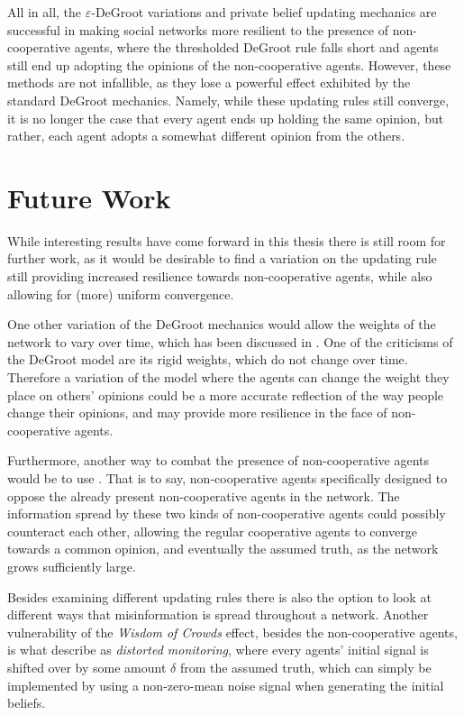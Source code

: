 \documentclass[a4paper, 12pt]{report}
\begin{document}
\noindent All in all, the $\varepsilon$-DeGroot variations and private belief updating mechanics are successful in making social networks more resilient to the presence of non-cooperative agents, where the thresholded DeGroot rule falls short and agents still end up adopting the opinions of the non-cooperative agents. However, these methods are not infallible, as they lose a powerful effect exhibited by the standard DeGroot mechanics. Namely, while these updating rules still converge, it is no longer the case that every agent ends up holding the same opinion, but rather, each agent adopts a somewhat different opinion from the others.

\chapter{Future Work}

While interesting results have come forward in this thesis there is still room for further work, as it would be desirable to find a variation on the updating rule still providing increased resilience towards non-cooperative agents, while also allowing for (more) uniform convergence.

\noindent One other variation of the DeGroot mechanics would allow the weights of the network to vary over time, which has been discussed in \parencite{chatterjee1977stochastic}. One of the criticisms of the DeGroot model are its rigid weights, which do not change over time. Therefore a variation of the model where the agents can change the weight they place on others' opinions could be a more accurate reflection of the way people change their opinions, and may provide more resilience in the face of non-cooperative agents.

\noindent Furthermore, another way to combat the presence of non-cooperative agents would be to use . That is to say, non-cooperative agents specifically designed to oppose the already present non-cooperative agents in the network. The information spread by these two kinds of non-cooperative agents could possibly counteract each other, allowing the regular cooperative agents to converge towards a common opinion, and eventually the assumed truth, as the network grows sufficiently large.

\noindent Besides examining different updating rules there is also the option to look at different ways that misinformation is spread throughout a network. Another vulnerability of the \emph{Wisdom of Crowds} effect, besides the non-cooperative agents, is what \parencite{amir2021robust} describe as \emph{distorted monitoring}, where every agents' initial signal is shifted over by some amount $\delta$ from the assumed truth, which can simply be implemented by using a non-zero-mean noise signal when generating the initial beliefs.
\end{document}
